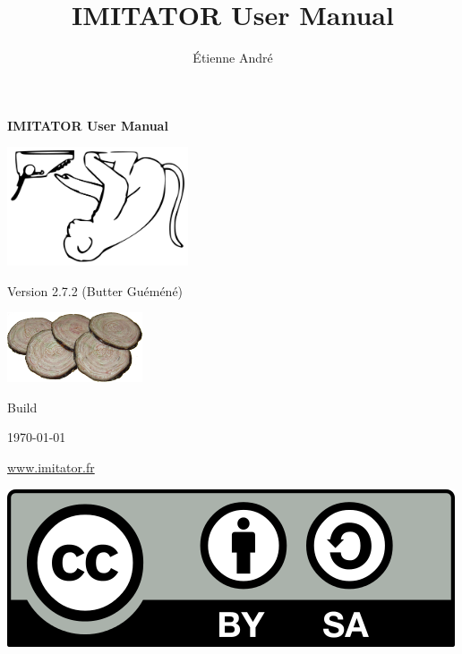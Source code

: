 \documentclass[a4paper,11pt]{report}
\title{IMITATOR User Manual}
\author{Étienne André}
\newcommand{\imitatorversion}{2.7.2}
\newcommand{\imitatorversionname}{Butter Guéméné}
\begin{document}

\sloppy


\thispagestyle{empty}

\mbox{}

\vspace{2cm}

\begin{center}
	{\Huge \bfseries IMITATOR User Manual}

	\vspace{2cm}

	\includegraphics[width=0.40\textwidth]{../logos/imitator-500.png}

	\vspace{2cm}
	
	{\Large Version \imitatorversion{} (\imitatorversionname{})}
	
	\medskip
	
	\includegraphics[width=0.30\textwidth]{../logos/logo2-7-300.png}

\end{center}

\vspace{2cm}

{\small \hfill{}Build }

{\small \hfill{}\today{}}

\vspace{2cm}

\begin{center}
 	{\Large \url{www.imitator.fr}}
 	
\end{center}
\hfill\includegraphics[width=.15\textwidth]{images/CC-BY-SA_500.png}
\end{document}

